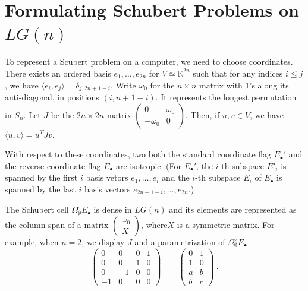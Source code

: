 \documentclass[12pt]{amsart}
\theoremstyle{remark}
\newcommand{\Edot}{E_\bullet}
\newcommand{\LG}{\textit{LG}}
\newcommand{\KK}{{\mathbb K}}
\newcommand{\defcolor}[1]{{\color{blue}#1}}
\begin{document}
\section{Formulating Schubert Problems on $LG(n)$}

To represent a Scubert problem on a computer, we need to choose coordinates.
There exists an ordered basis  $e_1,\dotsc,e_{2n}$ for $V\simeq\KK^{2n}$ such that for any indices  $i\leq j$, we have 
$\langle e_i,e_j\rangle = \delta_{j, 2n+1-i}$.
Write \defcolor{$\omega_0$} for the $n\times n$ matrix with 1's along its anti-diagonal, in positions $(i,n{+}1{-}i)$.
It represents the longest permutation in $S_n$.
Let $J$ be the $2n\times 2n$-matrix $\left(\begin{smallmatrix}0&\omega_0\\-\omega_0&0\end{smallmatrix}\right)$.
Then, if $u,v\in V$, we have $\langle u,v\rangle = u^T J v$.

With respect to these coordinates, two both the standard coordinate flag $\Edot'$ and the reverse coordinate flag $\Edot$
are isotropic.
(For $\Edot'$, the $i$-th subspace $E'_i$ is spanned by the first $i$ basis vetors $e_1,\dotsc,e_i$ and
the  $i$-th subspace $E_i$ of $\Edot$ is spanned by the last $i$ basis vectors $e_{2n+1-i},\dotsc, e_{2n}$.)

The Schubert cell $\Omega^\circ_\emptyset \Edot$ is dense in $\LG(n)$ and its elements are represented as the column span of a matrix
$\left(\begin{smallmatrix}\omega_0\\X\end{smallmatrix}\right)$, where$X$ is a symmetric matrix.
For example, when $n=2$, we display $J$ and a parametrization of $\Omega^\circ_\emptyset \Edot$
\[
\left(\begin{matrix} 0& 0&0&1\\ 0& 0&1&0\\ 0&-1&0&0\\ -1& 0&0&0\end{matrix}\right)
  \qquad
  \left(\begin{matrix} 0&1\\ 1&0\\ a&b\\ b&c\end{matrix}\right)\ .
\]



  \newpage
\end{document}
